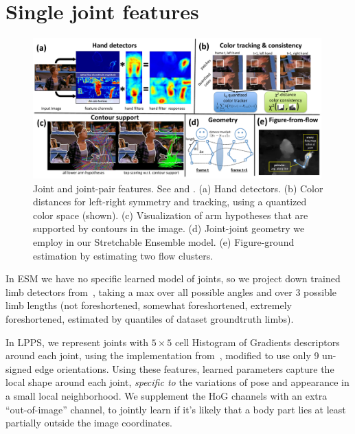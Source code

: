 \section{Single joint features} \label{sec:single-joint}

\begin{figure}[tb]
\begin{center}
\includegraphics[width=0.99\textwidth]{figs/misc-features.pdf}
\caption[Joint and joint-pair features.]{Joint and joint-pair features. See 
 and . (a)  Hand detectors.  (b) Color 
distances for left-right symmetry and tracking, using a quantized color space 
(shown).  (c) Visualization of arm hypotheses that are supported by contours in 
the image.  (d) Joint-joint geometry we employ in our Stretchable Ensemble 
model.  (e)  Figure-ground estimation by estimating two flow clusters.}
\label{fig:misc-features}
\end{center}
\end{figure}



In ESM we have no specific learned model of joints, so we project down trained 
limb detectors from~, taking a max over all possible angles 
and over 3 possible limb lengths (not foreshortened, somewhat foreshortened, 
extremely foreshortened, estimated by quantiles of dataset groundtruth limbs).

In LPPS, we represent joints with $5 \times 5$ cell Histogram of Gradients 
descriptors around each joint, using the implementation from~\cite{dpm}, 
modified to use only 9 un-signed edge orientations.  Using these features, 
learned parameters capture the local shape around each joint, {\em specific to} 
the variations of pose and appearance in a small local neighborhood.  We 
supplement the HoG channels with an extra ``out-of-image'' channel, to jointly 
learn if it's likely that a body part lies at least partially outside the image 
coordinates.

